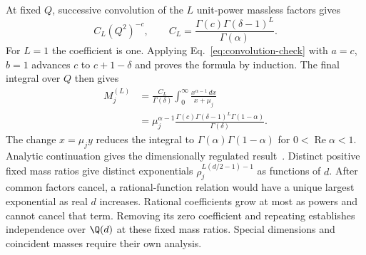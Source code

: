 At fixed $Q$, successive convolution of the $L$ unit-power massless factors gives
\begin{equation}
 C_L(Q^2)^{-c},\qquad
 C_L=\frac{\Gamma(c)\Gamma(\delta-1)^L}{\Gamma(\alpha)}.
\end{equation}
For $L=1$ the coefficient is one. Applying Eq.~\eqref{eq:convolution-check} with $a=c$, $b=1$ advances $c$ to $c+1-\delta$ and proves the formula by induction. The final integral over $Q$ then gives
\begin{align}
 M_j^{(L)}
 &=\frac{C_L}{\Gamma(\delta)}\int_0^\infty
       \frac{x^{\alpha-1}\,dx}{x+\mu_j}\nonumber\\
 &=\mu_j^{\alpha-1}
 \frac{\Gamma(c)\Gamma(\delta-1)^L\Gamma(1-\alpha)}{\Gamma(\delta)}.
 \label{eq:master-value-check}
\end{align}
The change $x=\mu_j y$ reduces the integral to
$\Gamma(\alpha)\Gamma(1-\alpha)$ for $0<\operatorname{Re}\alpha<1$. Analytic continuation gives the dimensionally regulated result~\cite{Weinzierl2022}. Distinct positive fixed mass ratios give distinct exponentials $\rho_j^{L(d/2-1)-1}$ as functions of $d$. After common factors cancel, a rational-function relation would have a unique largest exponential as real $d$ increases. Rational coefficients grow at most as powers and cannot cancel that term. Removing its zero coefficient and repeating establishes independence over $\Q(d)$ at these fixed mass ratios. Special dimensions and coincident masses require their own analysis.

